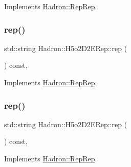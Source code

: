 Implements \mbox{\hyperlink{structHadron_1_1RepRep_ab3213025f6de249f7095892109575fde}{Hadron\+::\+Rep\+Rep}}.

\mbox{\label{structHadron_1_1H5o2D2ERep_a114f378ebe8c306a6530f530da8ac8d1}} 
\subsubsection{\texorpdfstring{rep()}{rep()}\hspace{0.1cm}{\footnotesize\ttfamily [2/5]}}
{\footnotesize\ttfamily std\+::string Hadron\+::\+H5o2\+D2\+E\+Rep\+::rep (\begin{DoxyParamCaption}{ }\end{DoxyParamCaption}) const\hspace{0.3cm}{\ttfamily [inline]}, {\ttfamily [virtual]}}



Implements \mbox{\hyperlink{structHadron_1_1RepRep_ab3213025f6de249f7095892109575fde}{Hadron\+::\+Rep\+Rep}}.

\mbox{\label{structHadron_1_1H5o2D2ERep_a114f378ebe8c306a6530f530da8ac8d1}} 
\subsubsection{\texorpdfstring{rep()}{rep()}\hspace{0.1cm}{\footnotesize\ttfamily [3/5]}}
{\footnotesize\ttfamily std\+::string Hadron\+::\+H5o2\+D2\+E\+Rep\+::rep (\begin{DoxyParamCaption}{ }\end{DoxyParamCaption}) const\hspace{0.3cm}{\ttfamily [inline]}, {\ttfamily [virtual]}}



Implements \mbox{\hyperlink{structHadron_1_1RepRep_ab3213025f6de249f7095892109575fde}{Hadron\+::\+Rep\+Rep}}.

\mbox{\label{structHadron_1_1H5o2D2ERep_a114f378ebe8c306a6530f530da8ac8d1}} 
